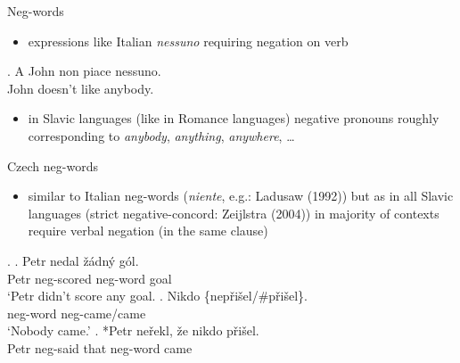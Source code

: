 \documentclass[
  ignorenonframetext,
]{beamer}
\providecommand{\tightlist}{%
  \setlength{\itemsep}{0pt}\setlength{\parskip}{0pt}}\usepackage{longtable,booktabs,array}
\begin{document}
\begin{frame}
\begin{block}{Neg-words}
\protect\hypertarget{neg-words}{}
\begin{itemize}
\tightlist
\item
  expressions like Italian \emph{nessuno} requiring negation on verb
\end{itemize}

\ex. A John non piace nessuno.\\
John doesn't like anybody.

\begin{itemize}
\tightlist
\item
  in Slavic languages (like in Romance languages) negative pronouns
  roughly corresponding to \emph{anybody}, \emph{anything},
  \emph{anywhere}, \ldots{}
\end{itemize}
\end{block}
\end{frame}

\begin{frame}
Czech neg-words

\begin{itemize}
\tightlist
\item
  similar to Italian neg-words (\emph{niente}, e.g.: Ladusaw (1992)) but
  as in all Slavic languages (strict negative-concord: Zeijlstra (2004))
  in majority of contexts require verbal negation (in the same clause)
\end{itemize}

\ex. \ag. Petr nedal žádný gól.\\
Petr neg-scored neg-word goal\\
`Petr didn't score any goal.\textquotesingle{} \bg. Nikdo
\{nepřišel/\#přišel\}.\\
neg-word neg-came/came\\
`Nobody came.' \cg. *Petr neřekl, že nikdo přišel.\\
Petr neg-said that neg-word came\\
\hspace*{0.333em}

~
\end{frame}
\end{document}
